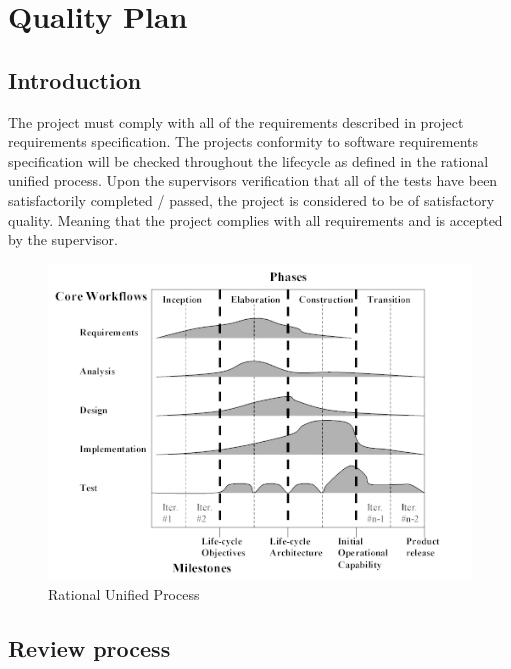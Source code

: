 \chapter{Quality Plan}

	\section{Introduction}
	
		The project must comply with all of the requirements described in project requirements specification.  
		The projects conformity to software requirements specification will be checked throughout the lifecycle 
		as defined in the rational unified process. Upon the supervisors verification that all of the tests have 
		been satisfactorily completed / passed, the project is considered to be of satisfactory quality.  
		Meaning that the project complies with all requirements and is accepted by the supervisor.
	
		\begin{figure}[h!]
			\centering
			\includegraphics[width=14cm]{figures/rup.jpg}
  			\caption{Rational Unified Process}
		\end{figure}
		
	\section{Review process}
	

